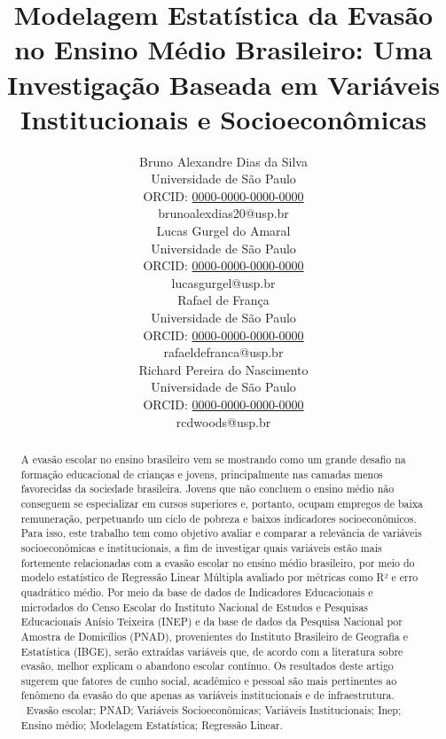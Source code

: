 \documentclass[english, spanish, brazilian]{RBIEarticle} %
\title{Modelagem Estatística da Evasão no Ensino Médio Brasileiro: Uma Investigação Baseada em Variáveis Institucionais e Socioeconômicas}
\author{%
	\parbox{3.8cm}{%
		Bruno Alexandre Dias da Silva\\
		Universidade de São Paulo\\
		ORCID: \href{https://orcid.org/0000-0000-0000-0000}{0000-0000-0000-0000}\\
		brunoalexdias20@usp.br
	}
        \hspace{0.3cm}
	\parbox{3.8cm}{%
		Lucas Gurgel do Amaral\\
		Universidade de São Paulo\\
		ORCID: \href{https://orcid.org/0000-0000-0000-0000}{0000-0000-0000-0000}\\
		lucasgurgel@usp.br
	}
        \hspace{0.3cm}
        \parbox{3.8cm}{%
		Rafael de França\\
		Universidade de São Paulo\\
		ORCID: \href{https://orcid.org/0000-0000-0000-0000}{0000-0000-0000-0000}\\
		rafaeldefranca@usp.br
	}
        \hspace{0.3cm}
	\parbox{3.9cm}{\raggedright%
		Richard Pereira do Nascimento\\
		Universidade de São Paulo\\
		ORCID: \href{https://orcid.org/0000-0000-0000-0000}{0000-0000-0000-0000}\\
		rcdwoods@usp.br
	}
}
\begin{document}
\maketitle

\begin{otherlanguage}{brazilian}
\begin{abstract}
A evasão escolar no ensino brasileiro vem se mostrando como um grande desafio na formação educacional de crianças e jovens, principalmente nas camadas menos favorecidas da sociedade brasileira. Jovens que não concluem o ensino médio não conseguem se especializar em cursos superiores e, portanto, ocupam empregos de baixa remuneração, perpetuando um ciclo de pobreza e baixos indicadores socioeconômicos. Para isso, este trabalho tem como objetivo avaliar e comparar a relevância de variáveis socioeconômicas e institucionais, a fim de investigar quais variáveis estão mais fortemente relacionadas com a evasão escolar no ensino médio brasileiro, por meio do modelo estatístico de Regressão Linear Múltipla avaliado por métricas como R² e erro quadrático médio. Por meio da base de dados de Indicadores Educacionais e microdados do Censo Escolar do Instituto Nacional de Estudos e Pesquisas Educacionais Anísio Teixeira (INEP) e da base de dados da Pesquisa Nacional por Amostra de Domicílios (PNAD), provenientes do Instituto Brasileiro de Geografia e Estatística (IBGE), serão extraídas variáveis que, de acordo com a literatura sobre evasão, melhor explicam o abandono escolar contínuo. Os resultados deste artigo sugerem que fatores de cunho social, acadêmico e pessoal são mais pertinentes ao fenômeno da evasão do que apenas as variáveis institucionais e de infraestrutura.
\keywords\ Evasão escolar; PNAD; Variáveis Socioeconômicas; Variáveis Institucionais; Inep; Ensino médio; Modelagem Estatística; Regressão Linear.
\end{abstract}
\end{otherlanguage}
\end{document}
